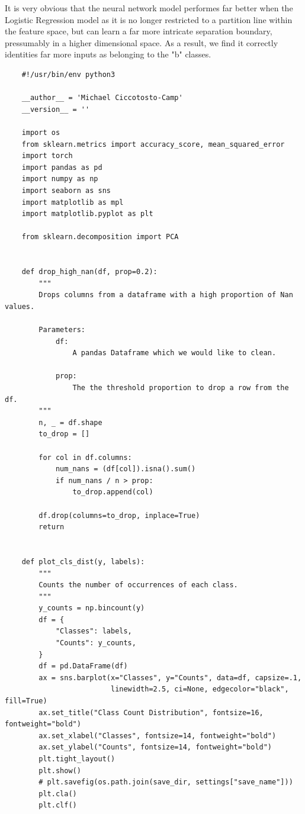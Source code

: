 \documentclass{article}
\begin{document}
It is very obvious that the neural network model performes far better when the Logistic Regression model as it is no longer restricted to a partition line within the feature space, but can learn a far more intricate separation boundary, pressumably in a higher dimensional space. As a result, we find it correctly identities far more inputs as belonging to the "b" classes.

\begin{verbatim}
    #!/usr/bin/env python3

    __author__ = 'Michael Ciccotosto-Camp'
    __version__ = ''
    
    import os
    from sklearn.metrics import accuracy_score, mean_squared_error
    import torch
    import pandas as pd
    import numpy as np
    import seaborn as sns
    import matplotlib as mpl
    import matplotlib.pyplot as plt
    
    from sklearn.decomposition import PCA
    
    
    def drop_high_nan(df, prop=0.2):
        """
        Drops columns from a dataframe with a high proportion of Nan values.
    
        Parameters:
            df:
                A pandas Dataframe which we would like to clean.
    
            prop:
                The the threshold proportion to drop a row from the df.
        """
        n, _ = df.shape
        to_drop = []
    
        for col in df.columns:
            num_nans = (df[col]).isna().sum()
            if num_nans / n > prop:
                to_drop.append(col)
    
        df.drop(columns=to_drop, inplace=True)
        return
    
    
    def plot_cls_dist(y, labels):
        """
        Counts the number of occurrences of each class.
        """
        y_counts = np.bincount(y)
        df = {
            "Classes": labels,
            "Counts": y_counts,
        }
        df = pd.DataFrame(df)
        ax = sns.barplot(x="Classes", y="Counts", data=df, capsize=.1,
                         linewidth=2.5, ci=None, edgecolor="black", fill=True)
        ax.set_title("Class Count Distribution", fontsize=16, fontweight="bold")
        ax.set_xlabel("Classes", fontsize=14, fontweight="bold")
        ax.set_ylabel("Counts", fontsize=14, fontweight="bold")
        plt.tight_layout()
        plt.show()
        # plt.savefig(os.path.join(save_dir, settings["save_name"]))
        plt.cla()
        plt.clf()
    

\end{verbatim}
\end{document}
